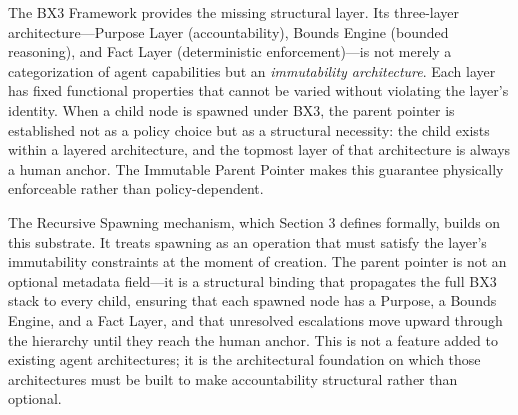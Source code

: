 The BX3 Framework provides the missing structural layer. Its three-layer architecture---Purpose Layer (accountability), Bounds Engine (bounded reasoning), and Fact Layer (deterministic enforcement)---is not merely a categorization of agent capabilities but an \textit{immutability architecture}. Each layer has fixed functional properties that cannot be varied without violating the layer's identity. When a child node is spawned under BX3, the parent pointer is established not as a policy choice but as a structural necessity: the child exists within a layered architecture, and the topmost layer of that architecture is always a human anchor. The Immutable Parent Pointer makes this guarantee physically enforceable rather than policy-dependent.

The Recursive Spawning mechanism, which Section 3 defines formally, builds on this substrate. It treats spawning as an operation that must satisfy the layer's immutability constraints at the moment of creation. The parent pointer is not an optional metadata field---it is a structural binding that propagates the full BX3 stack to every child, ensuring that each spawned node has a Purpose, a Bounds Engine, and a Fact Layer, and that unresolved escalations move upward through the hierarchy until they reach the human anchor. This is not a feature added to existing agent architectures; it is the architectural foundation on which those architectures must be built to make accountability structural rather than optional.